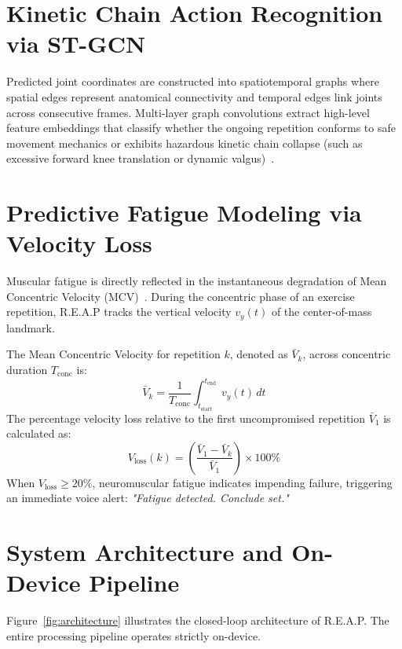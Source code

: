 \documentclass[12pt,a4paper]{report}
\begin{document}
\section{Kinetic Chain Action Recognition via ST-GCN}
Predicted joint coordinates are constructed into spatiotemporal graphs where spatial edges represent anatomical connectivity and temporal edges link joints across consecutive frames. Multi-layer graph convolutions extract high-level feature embeddings that classify whether the ongoing repetition conforms to safe movement mechanics or exhibits hazardous kinetic chain collapse (such as excessive forward knee translation or dynamic valgus)~\cite{escamilla2001knee}.

\section{Predictive Fatigue Modeling via Velocity Loss}
Muscular fatigue is directly reflected in the instantaneous degradation of Mean Concentric Velocity (MCV)~\cite{sanchez2011velocity}. During the concentric phase of an exercise repetition, R.E.A.P tracks the vertical velocity $v_y(t)$ of the center-of-mass landmark.

The Mean Concentric Velocity for repetition $k$, denoted as $\bar{V}_k$, across concentric duration $T_{\text{conc}}$ is:
\begin{equation}
    \bar{V}_k = \frac{1}{T_{\text{conc}}} \int_{t_{\text{start}}}^{t_{\text{end}}} v_y(t)\, dt
\end{equation}
The percentage velocity loss relative to the first uncompromised repetition $\bar{V}_1$ is calculated as:
\begin{equation}
    V_{\text{loss}}(k) = \left(\frac{\bar{V}_1 - \bar{V}_k}{\bar{V}_1}\right) \times 100\%
    \label{eq:vloss}
\end{equation}
When $V_{\text{loss}} \ge 20\%$, neuromuscular fatigue indicates impending failure, triggering an immediate voice alert: \textit{"Fatigue detected. Conclude set."}

\section{System Architecture and On-Device Pipeline}
Figure~\ref{fig:architecture} illustrates the closed-loop architecture of R.E.A.P. The entire processing pipeline operates strictly on-device.
\end{document}

